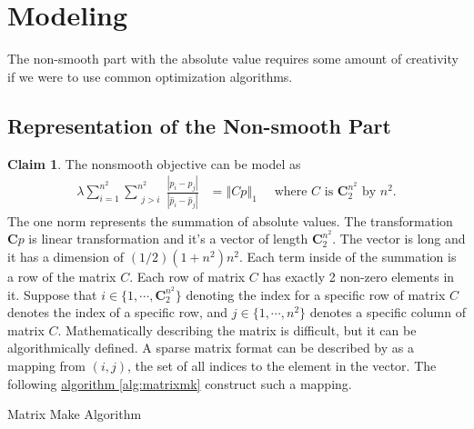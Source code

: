 \documentclass[11pt]{article}
\theoremstyle{definition}
\newtheorem{claim}{Claim}[subsection]
\numberwithin{equation}{subsection}
\begin{document}
        

\section{Modeling}
    
    The non-smooth part with the absolute value requires some amount of creativity if we were to use common optimization algorithms. 
    \subsection{Representation of the Non-smooth Part}\label{sec:opsplit_model}
        \begin{claim}
            The nonsmooth objective can be model as 
            \begin{align*}
                \lambda \sum_{i=1}^{n^2}\sum_{\substack{j> i}}^{n^2}
                \frac{|p_{i} - p_j|}{|\hat p_{i} - \hat p_j|}
                &= 
                \left\Vert
                    Cp
                \right\Vert_1 \quad 
                \text{ where $C$ is $\mathbf C_2^{n^2}$ by $n^2$}. 
            \end{align*}
            The one norm represents the summation of absolute values. 
            The transformation $\mathbf Cp$ is linear transformation and it's a vector of length $\mathbf C_2^{n^2}$. 
            The vector is long and it has a dimension of $(1/2)(1 +n^2)n^2$. 
            Each term inside of the summation is a row of the matrix $C$. 
            Each row of matrix $C$ has exactly 2 non-zero elements in it. 
            Suppose that $i\in \{1,\cdots,\mathbf C^{n^2}_2\}$ denoting the index for a specific row of matrix $C$ denotes the index of a specific row, and $j\in \{1, \cdots, n^2\}$ denotes a specific column of matrix $C$. 
            Mathematically describing the matrix is difficult, but it can be algorithmically defined.
            A sparse matrix format can be described by as a mapping from $(i,j)$, the set of all indices to the element in the vector. 
            The following 
            \hyperref[alg:matrixmk]{algorithm \ref{alg:matrixmk}}
            construct such a mapping. 
            \begin{algorithm}[H]
                \begin{algorithmic}[1]
                        \ENDIF
                    \ENDFOR
                \ENDFOR
                \end{algorithmic}
                \caption{Matrix Make Algorithm}
                \label{alg:matrixmk}
            \end{algorithm}
            

\end{claim}
\end{document}
